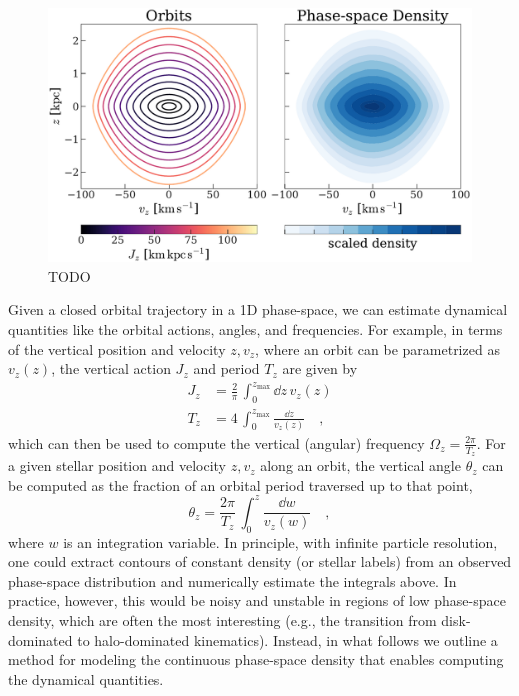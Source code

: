 \begin{figure}[!th]
\begin{center}
\includegraphics[width=\textwidth]{illustrate-zvz.pdf}
\end{center}
\caption{%
TODO
\label{fig:zvz}
}
\end{figure}

Given a closed orbital trajectory in a 1D phase-space, we can estimate dynamical
quantities like the orbital actions, angles, and frequencies.
For example, in terms of the vertical position and velocity $z, v_z$, where an orbit can
be parametrized as $v_z(z)$, the vertical action $J_z$ and period $T_z$ are given by
\begin{align}
    J_z &= \frac{2}{\pi} \, \int_0^{z_{\textrm{max}}} \dd z \, v_z(z) \\
    T_z &= 4 \, \int_0^{z_{\textrm{max}}} \frac{\dd z}{v_z(z)}\quad ,
\end{align}
which can then be used to compute the vertical (angular) frequency $\Omega_z =
\frac{2\pi}{T_z}$.
For a given stellar position and velocity $z, v_z$ along an orbit, the vertical angle
$\theta_z$ can be computed as the fraction of an orbital period traversed up to that
point,
\begin{equation}
    \theta_z = \frac{2\pi}{T_z} \, \int_0^{z} \frac{\dd w}{v_z(w)} \quad ,
\end{equation}
where $w$ is an integration variable.
In principle, with infinite particle resolution, one could extract contours of constant
density (or stellar labels) from an observed phase-space distribution and numerically
estimate the integrals above.
In practice, however, this would be noisy and unstable in regions of low phase-space
density, which are often the most interesting (e.g., the transition from disk-dominated
to halo-dominated kinematics).
Instead, in what follows we outline a method for modeling the continuous phase-space
density that enables computing the dynamical quantities.


